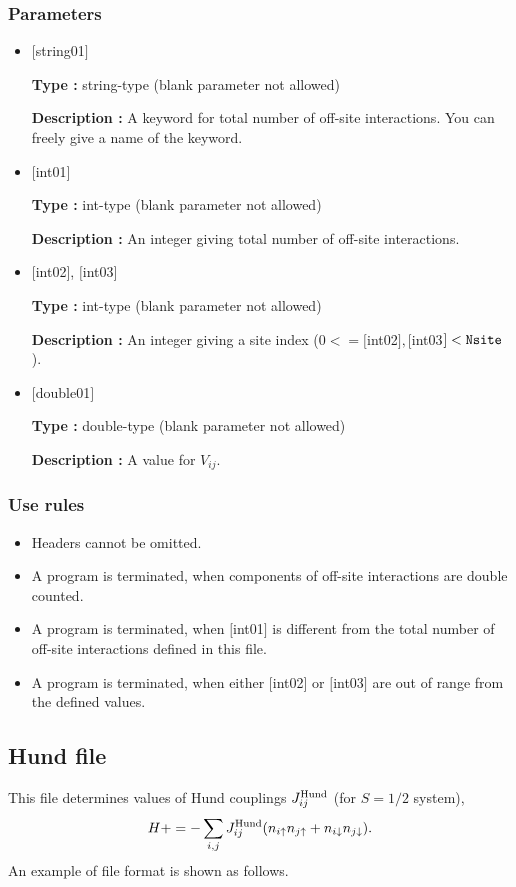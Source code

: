 \subsubsection{Parameters}
 \begin{itemize}

   \item  $[$string01$]$
   
    {\bf Type :} string-type (blank parameter not allowed)

   {\bf Description :} A keyword for total number of off-site interactions. You can freely give a name of the keyword.

   \item  $[$int01$]$
   
    {\bf Type :} int-type (blank parameter not allowed)

   {\bf Description :}  An integer giving total number of off-site interactions.

  \item  $[$int02$]$, $[$int03$]$
  
 {\bf Type :} int-type (blank parameter not allowed)

{\bf Description :} An integer giving a site index ($0<= [$int02$], [$int03$]<\verb|Nsite|$).
 
 \item  $[$double01$]$
   
   {\bf Type :} double-type (blank parameter not allowed)

  {\bf Description :}  A value for $V_{ij}$.
  
\end{itemize}

\subsubsection{Use rules}
\begin{itemize}
\item Headers cannot be omitted. 
\item A program is terminated, when components of off-site interactions are double counted.
\item A program is terminated, when $[$int01$]$ is different from the total number of off-site interactions defined in this file.
\item A program is terminated, when either $[$int02$]$ or $[$int03$]$ are out of range from the defined values.
\end{itemize}

\newpage
\subsection{Hund file}
This file determines values of Hund couplings $J_{ij}^{\rm Hund}$ {(for $S=1/2$ system)},
\begin{equation}
H+=-\sum_{i,j}J_{ij}^{\rm Hund} (n_{i\uparrow}n_{j\uparrow}+n_{i\downarrow}n_{j\downarrow}).
\end{equation}
An example of file format is shown as follows.

